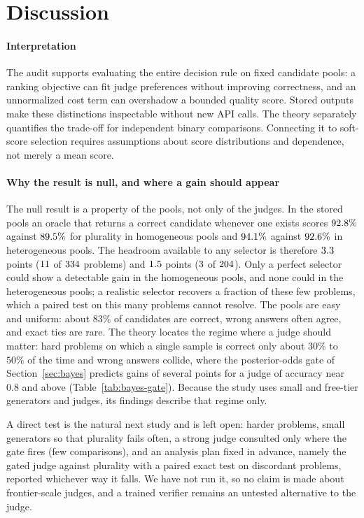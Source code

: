 \documentclass[preprint,11pt,number,sort&compress]{elsarticle}
\begin{document}
\section{Discussion}

\paragraph{Interpretation}
The audit supports evaluating the entire decision rule on fixed candidate
pools: a ranking objective can fit judge preferences without improving
correctness, and an unnormalized cost term can overshadow a bounded quality
score. Stored outputs make these distinctions inspectable without new API
calls. The theory separately quantifies the trade-off for independent binary
comparisons. Connecting it to soft-score selection requires assumptions
about score distributions and dependence, not merely a mean score.

\paragraph{Why the result is null, and where a gain should appear}
\label{sec:headroom}
The null result is a property of the pools, not only of the judges. In the stored pools an oracle that returns a correct
candidate whenever one exists scores $92.8\%$ against $89.5\%$ for plurality in homogeneous pools and
$94.1\%$ against $92.6\%$ in heterogeneous pools. The headroom available to any selector is therefore
$3.3$ points ($11$ of $334$ problems) and $1.5$ points ($3$ of $204$). Only a
perfect selector could show a detectable gain in the homogeneous pools, and none could in the heterogeneous pools; a realistic
selector recovers a fraction of these few problems, which a paired test on this many problems cannot resolve. The pools are easy and uniform: about $83\%$ of
candidates are correct, wrong answers often agree, and exact ties are rare. The theory locates the regime where a judge should
matter: hard problems on which a single sample is correct only about $30\%$ to $50\%$ of the time and wrong answers
collide, where the posterior-odds gate of Section~\ref{sec:bayes} predicts gains of several points for a judge of accuracy near
$0.8$ and above (Table~\ref{tab:bayes-gate}). Because the study uses small and free-tier generators and judges, its findings
describe that regime only.

A direct test is the natural next study and is left open: harder problems, small generators so that plurality fails often, a
strong judge consulted only where the gate fires (few comparisons), and an analysis plan fixed in advance, namely the gated judge
against plurality with a paired exact test on discordant problems, reported whichever way it falls. We have not run it, so no
claim is made about frontier-scale judges, and a trained verifier remains an untested alternative to the judge.
\end{document}
